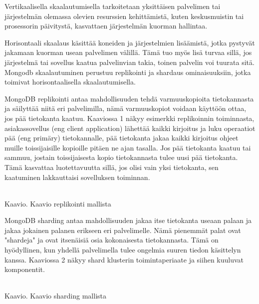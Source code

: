 Vertikaalisella skaalautumisella tarkoitetaan yksittäisen palvelimen tai järjestelmän olemassa olevien resurssien kehittämistä, 
kuten keskusmuistin tai prosessorin päivitystä, kasvattaen järjestelmän kuorman hallintaa.
\medskip

Horisontaali skaalaus käsittää koneiden ja järjestelmien lisäämistä, jotka pystyvät jakamaan kuorman usean palvelimen välillä.
Tämä tuo myös lisä turvaa sillä, jos järjestelmä tai sovellus kaatua palvelinvian takia, 
toinen palvelin voi tuurata sitä. 
Mongodb skaalautuminen perustuu replikointi ja shardaus ominaisuuksiin, jotka toimivat horisontaalisella skaalautumisella. 
\medskip






MongoDB replikointi antaa mahdollisuuden tehdä varmuuskopioita tietokannasta ja säilyttää niitä eri palvelimilla, 
nämä varmuuskopiot voidaan käyttöön ottaa, jos pää tietokanta kaatuu. 
Kaaviossa 1 näkyy esimerkki replikoinnin toiminnasta, asiakassovellus (eng client application) lähettää kaikki kirjoitus ja luku operaatiot pää (eng primäry) tietokannalle, 
pää tietokanta jakaa kaikki kirjoitus ohjeet muille toissijaisille kopioille pitäen ne ajan tasalla.
Jos pää tietokanta kaatuu tai sammuu, jostain toissijaisesta kopio tietokannasta tulee uusi pää tietokanta.
Tämä kasvattaa luotettavuutta sillä, jos olisi vain yksi tietokanta, sen kaatuminen lakkauttaisi sovelluksen toiminnan. 
\medskip
\bigskip

\\
Kaavio\getChartCount{}. Kaavio replikointi mallista 
\medskip



MongoDB sharding antaa mahdollisuuden jakaa itse tietokanta useaan palaan ja jakaa jokainen palanen erikseen eri palvelimelle.
Nämä pienemmät palat ovat "shardeja"{} ja ovat itsenäisiä osia kokonaisesta tietokannasta.
Tämä on hyödyllinen, kun yhdellä palvelimella tulee ongelmia suuren tiedon käsittelyn kanssa.
Kaaviossa 2 näkyy shard klusterin toimintaperiaate ja siihen kuuluvat komponentit. 
\medskip



\bigskip
\\
Kaavio\getChartCount{}. Kaavio sharding mallista 
\medskip


